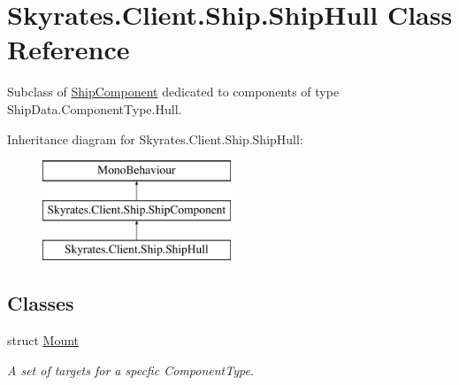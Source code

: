 \hypertarget{class_skyrates_1_1_client_1_1_ship_1_1_ship_hull}{\section{Skyrates.\-Client.\-Ship.\-Ship\-Hull Class Reference}
\label{class_skyrates_1_1_client_1_1_ship_1_1_ship_hull}
}


Subclass of \hyperlink{class_skyrates_1_1_client_1_1_ship_1_1_ship_component}{Ship\-Component} dedicated to components of type Ship\-Data.\-Component\-Type.\-Hull.  


Inheritance diagram for Skyrates.\-Client.\-Ship.\-Ship\-Hull\-:\begin{figure}[H]
\begin{center}
\leavevmode
\includegraphics[height=3.000000cm]{class_skyrates_1_1_client_1_1_ship_1_1_ship_hull}
\end{center}
\end{figure}
\subsection*{Classes}
\begin{DoxyCompactItemize}
\item 
struct \hyperlink{struct_skyrates_1_1_client_1_1_ship_1_1_ship_hull_1_1_mount}{Mount}
\begin{DoxyCompactList}\small\item\em A set of targets for a specfic Component\-Type. \end{DoxyCompactList}\end{DoxyCompactItemize}
